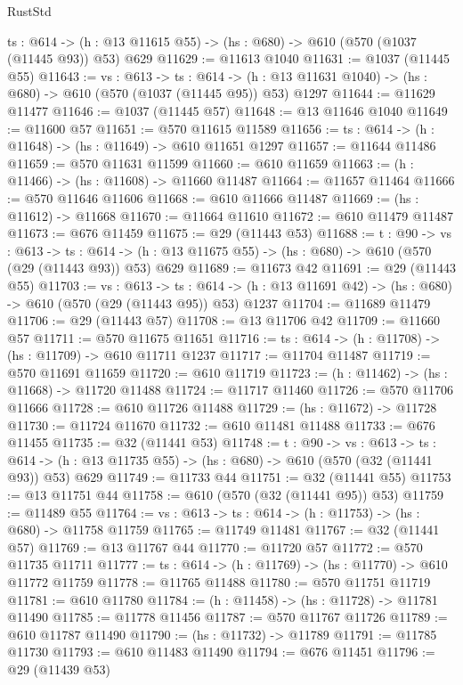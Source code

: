 \begin{lexlean}{RustStd}
\begin{coremodule}
  {ts : @614} -> (h : @13 @11615 @55) -> (hs : @680) -> @610 (@570 (@1037 (@11445 @93)) @53) @629
@11629 := @11613 @1040
@11631 := @1037 (@11445 @55)
@11643 := {vs : @613} ->
  {ts : @614} -> (h : @13 @11631 @1040) -> (hs : @680) -> @610 (@570 (@1037 (@11445 @95)) @53) @1297
@11644 := @11629 @11477
@11646 := @1037 (@11445 @57)
@11648 := @13 @11646 @1040
@11649 := @11600 @57
@11651 := @570 @11615 @11589
@11656 := {ts : @614} -> (h : @11648) -> (hs : @11649) -> @610 @11651 @1297
@11657 := @11644 @11486
@11659 := @570 @11631 @11599
@11660 := @610 @11659
@11663 := (h : @11466) -> (hs : @11608) -> @11660 @11487
@11664 := @11657 @11464
@11666 := @570 @11646 @11606
@11668 := @610 @11666 @11487
@11669 := (hs : @11612) -> @11668
@11670 := @11664 @11610
@11672 := @610 @11479 @11487
@11673 := @676 @11459
@11675 := @29 (@11443 @53)
@11688 := {t : @90} ->
  {vs : @613} ->
  {ts : @614} -> (h : @13 @11675 @55) -> (hs : @680) -> @610 (@570 (@29 (@11443 @93)) @53) @629
@11689 := @11673 @42
@11691 := @29 (@11443 @55)
@11703 := {vs : @613} ->
  {ts : @614} -> (h : @13 @11691 @42) -> (hs : @680) -> @610 (@570 (@29 (@11443 @95)) @53) @1237
@11704 := @11689 @11479
@11706 := @29 (@11443 @57)
@11708 := @13 @11706 @42
@11709 := @11660 @57
@11711 := @570 @11675 @11651
@11716 := {ts : @614} -> (h : @11708) -> (hs : @11709) -> @610 @11711 @1237
@11717 := @11704 @11487
@11719 := @570 @11691 @11659
@11720 := @610 @11719
@11723 := (h : @11462) -> (hs : @11668) -> @11720 @11488
@11724 := @11717 @11460
@11726 := @570 @11706 @11666
@11728 := @610 @11726 @11488
@11729 := (hs : @11672) -> @11728
@11730 := @11724 @11670
@11732 := @610 @11481 @11488
@11733 := @676 @11455
@11735 := @32 (@11441 @53)
@11748 := {t : @90} ->
  {vs : @613} ->
  {ts : @614} -> (h : @13 @11735 @55) -> (hs : @680) -> @610 (@570 (@32 (@11441 @93)) @53) @629
@11749 := @11733 @44
@11751 := @32 (@11441 @55)
@11753 := @13 @11751 @44
@11758 := @610 (@570 (@32 (@11441 @95)) @53)
@11759 := @11489 @55
@11764 := {vs : @613} -> {ts : @614} -> (h : @11753) -> (hs : @680) -> @11758 @11759
@11765 := @11749 @11481
@11767 := @32 (@11441 @57)
@11769 := @13 @11767 @44
@11770 := @11720 @57
@11772 := @570 @11735 @11711
@11777 := {ts : @614} -> (h : @11769) -> (hs : @11770) -> @610 @11772 @11759
@11778 := @11765 @11488
@11780 := @570 @11751 @11719
@11781 := @610 @11780
@11784 := (h : @11458) -> (hs : @11728) -> @11781 @11490
@11785 := @11778 @11456
@11787 := @570 @11767 @11726
@11789 := @610 @11787 @11490
@11790 := (hs : @11732) -> @11789
@11791 := @11785 @11730
@11793 := @610 @11483 @11490
@11794 := @676 @11451
@11796 := @29 (@11439 @53)

\end{coremodule}
\end{lexlean}
